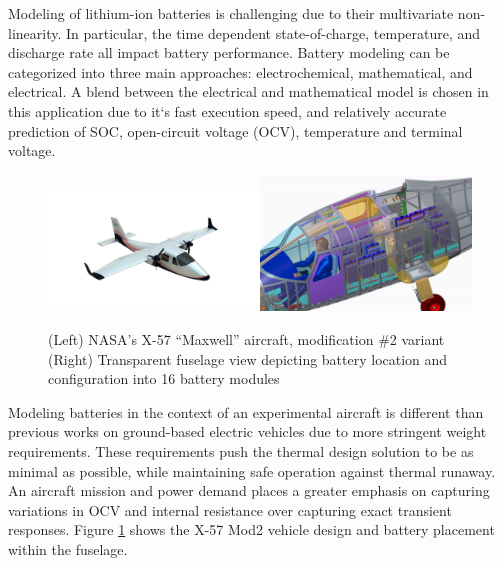 \documentclass[]{aiaa-tc}%
\begin{document}
Modeling of lithium-ion batteries is challenging due to their multivariate non-linearity. In particular, the time dependent state-of-charge, temperature, and discharge rate all impact battery performance. Battery modeling can be categorized into three main approaches: electrochemical, mathematical, and electrical. A blend between the electrical and mathematical model is chosen in this application due to it`s fast execution speed, and relatively accurate prediction of SOC, open-circuit voltage (OCV), temperature and terminal voltage.

\begin{figure}[!htb]%
	\centering
	\includegraphics[width=0.5\textwidth]{figures/X57_mod2.png}\includegraphics[width=0.5\textwidth]{figures/batt_loc.png}
	\caption{(Left) NASA's X-57 ``Maxwell'' aircraft, modification \#2 variant
	(Right) Transparent fuselage view depicting battery location and configuration into 16 battery modules}
	\label{fig:X57}
\end{figure}

Modeling batteries in the context of an experimental aircraft is different than previous works on ground-based electric vehicles due to more stringent weight requirements. These requirements push the thermal design solution to be as minimal as possible, while maintaining safe operation against thermal runaway. An aircraft mission and power demand places a greater emphasis on capturing variations in OCV and internal resistance over capturing exact transient responses. Figure \ref{fig:X57} shows the X-57 Mod2 vehicle design and battery placement within the fuselage. 
\end{document}
